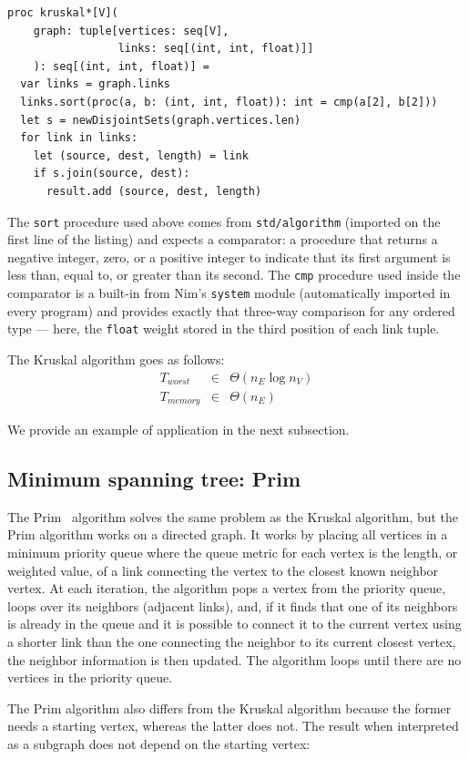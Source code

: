 \documentclass[justified, sixbynine]{tufte-book}
\def\ft{\small\tt}
\theoremstyle{plain}%
\newtheorem * {corollary}{Corollary}
\theoremstyle{definition}
\theoremstyle{remark}
\newtheorem * {remark}{Remark}
\newtheorem * {note}{Note}
\begin{document}
\begin{fullwidth}
\begin{lstlisting}[caption={in file: {\ft nlib/graph.nim}}]
proc kruskal*[V](
    graph: tuple[vertices: seq[V],
                 links: seq[(int, int, float)]]
    ): seq[(int, int, float)] =
  var links = graph.links
  links.sort(proc(a, b: (int, int, float)): int = cmp(a[2], b[2]))
  let s = newDisjointSets(graph.vertices.len)
  for link in links:
    let (source, dest, length) = link
    if s.join(source, dest):
      result.add (source, dest, length)
\end{lstlisting}

The {\ft sort} procedure used above comes from {\ft std/algorithm} (imported on the first line of the listing) and expects a comparator: a procedure that returns a negative integer, zero, or a positive integer to indicate that its first argument is less than, equal to, or greater than its second. The {\ft cmp} procedure used inside the comparator is a built-in from Nim's {\ft system} module (automatically imported in every program) and provides exactly that three-way comparison for any ordered type --- here, the {\ft float} weight stored in the third position of each link tuple.

The Kruskal algorithm goes as follows:
\begin{eqnarray}
T_{worst} &\in &\Theta (n_E\log n_V) \\
T_{memory} &\in &\Theta (n_E)
\end{eqnarray}

We provide an example of application in the next subsection.

\goodbreak\subsection{Minimum spanning tree: Prim}

The Prim~\cite{prim} algorithm solves the same problem as the Kruskal algorithm, but the Prim algorithm works on a directed graph. It works by placing all vertices in a minimum priority queue where the queue metric for each vertex is the length, or weighted value, of a link connecting the vertex to the closest known neighbor vertex. At each iteration, the algorithm pops a vertex from the priority queue, loops over its neighbors (adjacent links), and, if it finds that one of its neighbors is already in the queue and it is possible to connect it to the current vertex using a shorter link than the one connecting the neighbor to its current closest vertex, the neighbor information is then updated. The algorithm loops until there are no vertices in the priority queue.

The Prim algorithm also differs from the Kruskal algorithm because the former needs a starting vertex, whereas the latter does not. The result when interpreted as a subgraph does not depend on the starting vertex:


\end{fullwidth}
\end{document}

